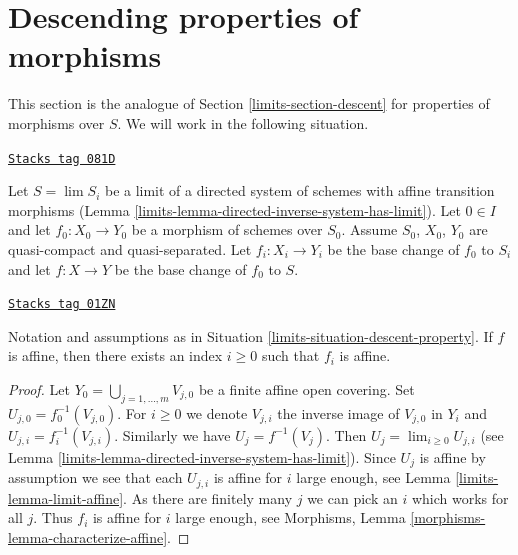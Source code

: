 \section{Descending properties of morphisms}
\label{limits-section-descent-of-properties}
This section is the analogue of
Section \ref{limits-section-descent}
for properties of morphisms over $S$.
We will work in the following situation.

\begin{definition}
\label{limits-situation-descent-property}
\href{https://stacks.math.columbia.edu/tag/081D}{\texttt{Stacks tag 081D}}

Let $S = \lim S_i$ be a limit of a directed system of schemes
with affine transition morphisms
(Lemma \ref{limits-lemma-directed-inverse-system-has-limit}).
Let $0 \in I$ and let $f_0 : X_0 \to Y_0$ be a morphism of schemes over $S_0$.
Assume $S_0$, $X_0$, $Y_0$ are quasi-compact and quasi-separated.
Let $f_i : X_i \to Y_i$ be the base change of $f_0$ to $S_i$ and
let $f : X \to Y$ be the base change of $f_0$ to $S$.
\end{definition}

\begin{lemma}
\label{limits-lemma-descend-affine-finite-presentation}
\href{https://stacks.math.columbia.edu/tag/01ZN}{\texttt{Stacks tag 01ZN}}

Notation and assumptions as in Situation \ref{limits-situation-descent-property}.
If $f$ is affine, then there exists an index $i \geq 0$
such that $f_i$ is affine.
\end{lemma}

\begin{proof}

Let $Y_0 = \bigcup_{j = 1, \ldots, m} V_{j, 0}$ be a finite affine
open covering. Set $U_{j, 0} = f_0^{-1}(V_{j, 0})$. For $i \geq 0$
we denote $V_{j, i}$ the inverse image of $V_{j, 0}$ in $Y_i$ and
$U_{j, i} = f_i^{-1}(V_{j, i})$. Similarly we have
$U_j = f^{-1}(V_j)$. Then $U_j = \lim_{i \geq 0} U_{j, i}$
(see Lemma \ref{limits-lemma-directed-inverse-system-has-limit}).
Since $U_j$ is affine by assumption we see that
each $U_{j, i}$ is affine for $i$ large enough, see
Lemma \ref{limits-lemma-limit-affine}. As there are finitely many $j$ we
can pick an $i$ which works for all $j$. Thus $f_i$ is
affine for $i$ large enough, see
Morphisms, Lemma \ref{morphisms-lemma-characterize-affine}.
\end{proof}

